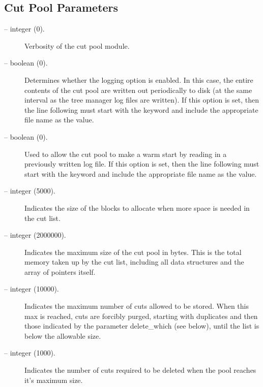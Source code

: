 \subsection{Cut Pool Parameters}
\label{cut_pool_params}
\begin{description}

\item[ -- integer (0).] 
Verbosity of the cut pool module.

\item[ -- boolean (0).] 
Determines whether the logging option is enabled. In this case, the
entire contents of the cut pool are written out periodically to disk
(at the same interval as the tree manager log files are written). If
this option is set, then the line following must start with the
keyword  and include the appropriate
file name as the value.

\item[ -- boolean (0).] 
Used to allow the cut pool to make a warm start by reading in a
previously written log file. If
this option is set, then the line following must start with the
keyword  and include the appropriate
file name as the value.

\item[ -- integer (5000).] 
Indicates the size of the blocks to allocate when more space is needed
in the cut list.

\item[ -- integer (2000000).] 
Indicates the maximum size of the cut pool in bytes. This is the total
memory taken up by the cut list, including all data structures and the
array of pointers itself.

\item[ -- integer (10000).] 
Indicates the maximum number of cuts allowed to be stored. When this
max is reached, cuts are forcibly purged, starting with duplicates
and then those indicated by the parameter 
{delete_which} (see below), until the list is below the allowable size.

\item[ -- integer (1000).]
Indicates the number of cuts required to be deleted when the pool reaches
it's maximum size.


\end{description}
